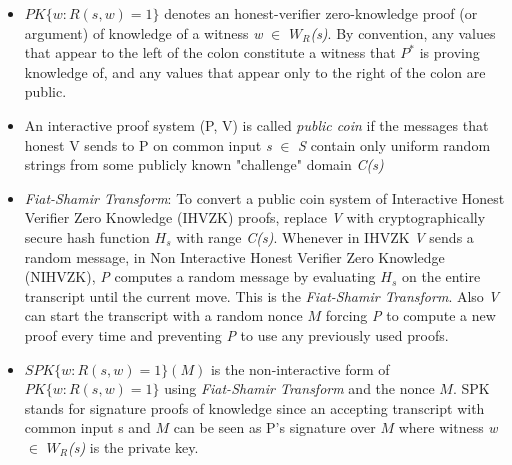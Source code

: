 \documentclass[a4paper]{article}
\begin{document}
\begin{itemize}
  \item $PK\{w : R(s,w) = 1\}$ denotes an honest-verifier zero-knowledge proof (or argument) of knowledge of a witness \textit{w} $\in$ \textit{$W_R$(s)}. By convention, any values that appear to the left of the colon constitute a witness that ${P^{*}}$ is proving knowledge of, and any values that appear only to the right of the colon are public.
  \item An interactive proof system (P, V) is called \emph{public coin} if the messages that honest V sends to P on common input \textit{s} $\in$ \textit{S} contain only uniform random strings from some publicly known "challenge" domain \textit{C(s)} 
  \item \emph{Fiat-Shamir Transform}: To convert a public coin system of Interactive Honest Verifier Zero Knowledge (IHVZK) proofs, replace \textit{V} with cryptographically secure hash function $H_s$ with range \textit{C(s)}. Whenever in IHVZK \textit{V} sends a random message, in Non Interactive Honest Verifier Zero Knowledge (NIHVZK), \textit{P} computes a random message by evaluating $H_s$ on the entire transcript until the current move. This is the \emph{Fiat-Shamir Transform}. Also \textit{V} can start the transcript with a random nonce $M$ forcing \textit{P} to compute a new proof every time and preventing \textit{P} to use any previously used proofs.
  \item $SPK\{w : R(s,w) = 1\}(M)$ is the non-interactive form of $PK\{w : R(s,w) = 1\}$ using \emph{Fiat-Shamir Transform} and the nonce $M$. SPK stands for signature proofs of knowledge since an accepting transcript with common input s and $M$ can be seen as P's signature over $M$ where witness \textit{w} $\in$ \textit{$W_R$(s)} is the private key. 
\end{itemize}
\end{document}
